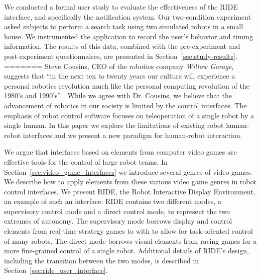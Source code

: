 We conducted a formal user study to evaluate the effectiveness of the RIDE interface, and specifically the notification system. Our two-condition experiment asked subjects to perform a search task using two simulated robots in a small house. We instrumented the application to record the user's behavior and timing information. The results of this data, combined with the pre-experiment and post-experiment questionnaires, are presented in Section~\ref{sec:study-results}.
=======
Steve Cousins, CEO of the robotics company \emph{Willow Garage}, suggests that ``in the next ten to twenty years our culture will experience a personal robotics revolution much like the personal computing revolution of the 1980's and 1990's'' \cite{Cousins}. While we agree with Dr. Cousins, we believe that the advancement of robotics in our society is limited by the control interfaces. The emphasis of robot control software focuses on teleoperation of a single robot by a single human. In this paper we explore the limitations of existing robot human-robot interfaces and we present a new paradigm for human-robot interaction.


We argue that interfaces based on elements from computer video games are effective tools for the control of large robot teams. In Section~\ref{sec:video_game_interfaces} we introduce several genres of video games. We describe how to apply elements from these various video game genres in robot control interfaces. We present RIDE, the Robot Interactive Display Environment, an example of such an interface. RIDE contains two different modes, a supervisory control mode and a direct control mode, to represent the two extremes of autonomy. The supervisory mode borrows display and control elements from real-time strategy games to with to allow for task-oriented control of many robots. The direct mode borrows visual elements from racing games for a more fine-grained control of a single robot. Additional details of RIDE's design, including the transition between the two modes, is described in Section~\ref{sec:ride_user_interface}.

